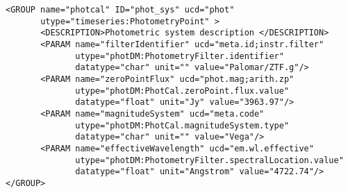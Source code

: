 \noindent
\begingroup\footnotesize
\begin{tcolorbox}
\begin{verbatim}
<GROUP name="photcal" ID="phot_sys" ucd="phot" 
       utype="timeseries:PhotometryPoint" > 
       <DESCRIPTION>Photometric system description </DESCRIPTION>
       <PARAM name="filterIdentifier" ucd="meta.id;instr.filter" 
              utype="photDM:PhotometryFilter.identifier" 
              datatype="char" unit="" value="Palomar/ZTF.g"/>
       <PARAM name="zeroPointFlux" ucd="phot.mag;arith.zp" 
              utype="photDM:PhotCal.zeroPoint.flux.value" 
              datatype="float" unit="Jy" value="3963.97"/>
       <PARAM name="magnitudeSystem" ucd="meta.code" 
              utype="photDM:PhotCal.magnitudeSystem.type" 
              datatype="char" unit="" value="Vega"/>
       <PARAM name="effectiveWavelength" ucd="em.wl.effective" 
              utype="photDM:PhotometryFilter.spectralLocation.value" 
              datatype="float" unit="Angstrom" value="4722.74"/>
</GROUP>
\end{verbatim}
\end{tcolorbox}
\endgroup
